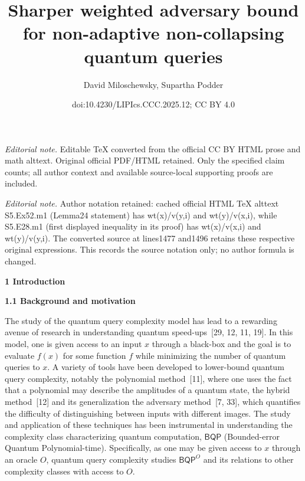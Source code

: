 \documentclass[10pt,a4paper]{article}
\title{Sharper weighted adversary bound for non-adaptive non-collapsing quantum queries}
\author{David Miloschewsky, Supartha Podder}
\date{doi:10.4230/LIPIcs.CCC.2025.12; CC BY 4.0}
\begin{document}
\maketitle
\noindent\textit{Editorial note.} Editable TeX converted from the official CC BY HTML prose and math alttext. Original official PDF/HTML retained. Only the specified claim counts; all author context and available source-local supporting proofs are included.\par\medskip
\noindent\textit{Editorial note.} Author notation retained: cached official HTML TeX alttext S5.Ex52.m1 (Lemma24 statement) has wt(x)/v(y,i) and wt(y)/v(x,i), while S5.E28.m1 (first displayed inequality in its proof) has wt(x)/v(x,i) and wt(y)/v(y,i). The converted source at lines1477 and1496 retains these respective original expressions. This records the source notation only; no author formula is changed.\par\medskip


\par\medskip\noindent\textbf{
1 Introduction}\par




\par\medskip\noindent\textbf{
1.1 Background and motivation}\par




The study of the quantum query complexity model has lead to a rewarding avenue of research in understanding quantum speed-ups [29, 12, 11, 19]. In this model, one is given access to an input $x$ through a black-box and the goal is to evaluate $f(x)$ for some function $f$ while minimizing the number of quantum queries to $x$. A variety of tools have been developed to lower-bound quantum query complexity, notably the polynomial method [11], where one uses the fact that a polynomial may describe the amplitudes of a quantum state, the hybrid method [12] and its generalization the adversary method [7, 33], which quantifies the difficulty of distinguishing between inputs with different images. The study and application of these techniques has been instrumental in understanding the complexity class characterizing quantum computation, $\mathsf{BQP}$ (Bounded-error Quantum Polynomial-time). Specifically, as one may be given access to $x$ through an oracle $O$, quantum query complexity studies $\mathsf{BQP}^{O}$ and its relations to other complexity classes with access to $O$.\par
\end{document}
